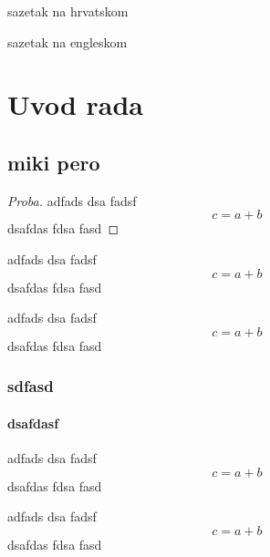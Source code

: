 \documentclass[zavrsni, alter, theoremfancy]{FSBtex}
\begin{document}
\titlepage



\begin{AbstractHR}
sazetak na hrvatskom
\end{AbstractHR}

\begin{AbstractEN}
sazetak na engleskom
\end{AbstractEN}

\PageNumberingArabic
\newpage
\chapter{Uvod rada}
\lipsum[1]
\section{miki pero}
\lipsum[1]


\begin{proof}[Proba]
adfads dsa fadsf
\begin{equation}
c = a + b
\end{equation}
dsafdas fdsa fasd
\end{proof}

\begin{exercise}[]
adfads dsa fadsf
\begin{equation}
c = a + b
\end{equation}
dsafdas fdsa fasd
\end{exercise}

\begin{example}[]
adfads dsa fadsf
\begin{equation}
c = a + b
\end{equation}
dsafdas fdsa fasd
\end{example}

\subsection{sdfasd}
\subsubsection{dsafdasf}
\lipsum[1]
\begin{theorem}[Proba]
adfads dsa fadsf
\begin{equation}
c = a + b
\end{equation}
dsafdas fdsa fasd
\end{theorem}
\lipsum[1]

\begin{definition}[Proba]
adfads dsa fadsf
\begin{equation}
c = a + b
\end{equation}
dsafdas fdsa fasd
\end{definition}
\end{document}
